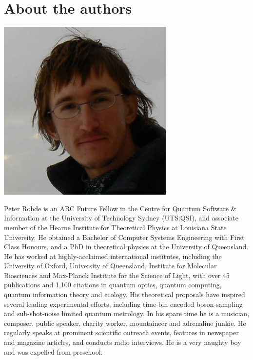 %
%

\section*{About the authors}

\includegraphics[width=\columnwidth]{photo_peter_rohde}

Peter Rohde is an ARC Future Fellow in the Centre for Quantum Software \& Information at the University of Technology Sydney (UTS:QSI), and associate member of the Hearne Institute for Theoretical Physics at Louisiana State University. He obtained a Bachelor of Computer Systems Engineering with First Class Honours, and a PhD in theoretical physics at the University of Queensland. He has worked at highly-acclaimed international institutes, including the University of Oxford, University of Queensland, Institute for Molecular Biosciences and Max-Planck Institute for the Science of Light, with over 45 publications and 1,100 citations in quantum optics, quantum computing, quantum information theory and ecology. His theoretical proposals have inspired several leading experimental efforts, including time-bin encoded boson-sampling and sub-shot-noise limited quantum metrology. In his spare time he is a musician, composer, public speaker, charity worker, mountaineer and adrenaline junkie. He regularly speaks at prominent scientific outreach events, features in newspaper and magazine articles, and conducts radio interviews. He is a very naughty boy and was expelled from preschool.

